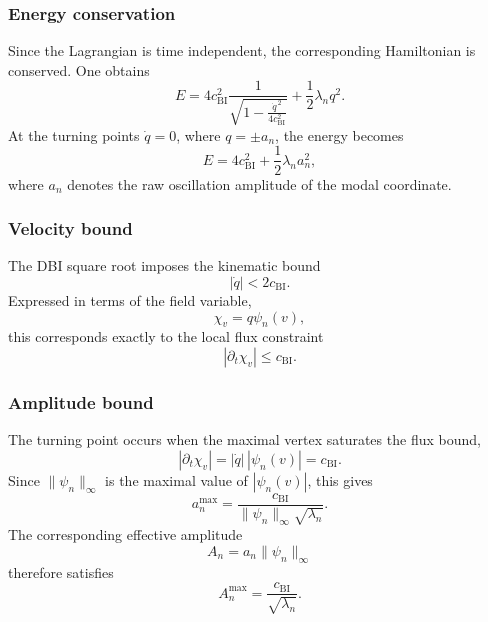 \documentclass[11pt,a4paper]{article}
\begin{document}
  \subsubsection*{Energy conservation}

    Since the Lagrangian is time independent, the corresponding Hamiltonian
    is conserved.
    One obtains
    \begin{equation}
      E
      =
      4c_{\mathrm{BI}}^2
      \frac{1}{\sqrt{1-\frac{\dot q^{\,2}}{4c_{\mathrm{BI}}^2}}}
      +
      \frac12\lambda_n q^2 .
    \end{equation}
    At the turning points $\dot q=0$, where $q=\pm a_n$, the energy becomes
    \begin{equation}
      E
      =
      4c_{\mathrm{BI}}^2
      +
      \frac12\lambda_n a_n^2 ,
    \end{equation}
    where $a_n$ denotes the raw oscillation amplitude of the modal coordinate.

  \subsubsection*{Velocity bound}

    The DBI square root imposes the kinematic bound
    \begin{equation}
      |\dot q| < 2c_{\mathrm{BI}} .
    \end{equation}
    Expressed in terms of the field variable,
    \[
      \chi_v = q\psi_n(v),
    \]
    this corresponds exactly to the local flux constraint
    \[
      |\partial_t \chi_v| \le c_{\mathrm{BI}} .
    \]

  \subsubsection*{Amplitude bound}

    The turning point occurs when the maximal vertex saturates the flux bound,
    \[
      |\partial_t\chi_v|
      =
      |\dot q|\,|\psi_n(v)|
      =
      c_{\mathrm{BI}} .
    \]
    Since $\|\psi_n\|_\infty$ is the maximal value of $|\psi_n(v)|$, this gives
    \begin{equation}
      a_n^{\max}
      =
      \frac{c_{\mathrm{BI}}}{\|\psi_n\|_\infty\sqrt{\lambda_n}} .
    \end{equation}
    The corresponding effective amplitude
    \[
      A_n = a_n\|\psi_n\|_\infty
    \]
    therefore satisfies
    \begin{equation}
      A_n^{\max}
      =
      \frac{c_{\mathrm{BI}}}{\sqrt{\lambda_n}} .
    \end{equation}
\end{document}

